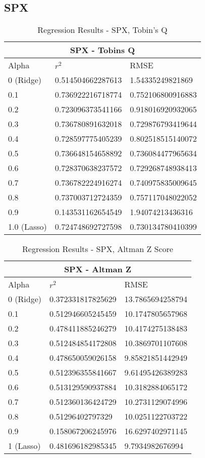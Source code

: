 \subsection{SPX}
\begin{table}[h!]
\centering
\begin{tabular}{ |p{2.5cm}||p{4cm}|p{4cm}| }
 \hline
 \multicolumn{3}{|c|}{SPX - Tobins Q} \\
 \hline
 Alpha & $r^2$ & RMSE \\
 \hline
 0 (Ridge) & 0.514504662287613 & 1.54335249821869 \\          
0.1 & 0.736922216718774 & 0.752106800916883\\
0.2 & 0.723096373541166 & 0.918016920932065\\
0.3 & 0.736780891632018 & 0.729876793419644\\
0.4 & 0.728597775405239 & 0.802518515140072\\
0.5 & 0.736648154658892 & 0.736084477965634\\
0.6 & 0.728370638237572 & 0.729268748938413\\
0.7 & 0.736782224916274 & 0.740975835009645\\
0.8 & 0.737003712724359 & 0.757117048022052\\
0.9 & 0.143531162654549 & 1.94074213436316\\
1.0 (Lasso) & 0.724748692727598 & 0.730134780410399 \\
 \hline
\end{tabular}
\caption{Regression Results  - SPX, Tobin's Q}
\end{table}


\begin{table}[h!]
\centering
\begin{tabular}{ |p{2.5cm}||p{4cm}|p{4cm}| }
 \hline
 \multicolumn{3}{|c|}{SPX - Altman Z} \\
 \hline
 Alpha & $r^2$ & RMSE \\
 \hline
0 (Ridge) & 0.372331817825629 & 13.7865694258794\\
0.1 & 0.512946605245459 & 10.1747805657968\\
0.2 & 0.478411885246279 & 10.4174275138483\\
\rowcolor{gray} 0.3 & 0.512484854172808 & 10.3869701107608\\
0.4 & 0.478650059026158 & 9.85821851442949\\
0.5 & 0.512396355841667 & 9.61495426389283\\
0.6 & 0.513129590937884 & 10.3182884065172\\
0.7 & 0.512360136424729 & 10.2731129074996\\
0.8 & 0.51296402797329 & 10.0251122703722\\
0.9 & 0.158067206245976 & 16.6297402971145\\
1 (Lasso) & 0.481696182985345 & 9.7934982676994\\
 \hline
\end{tabular}
\caption{Regression Results  - SPX, Altman Z Score}
\end{table}


